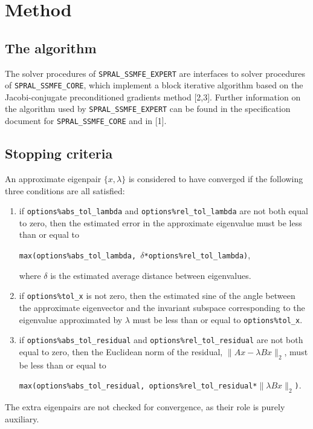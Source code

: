 \section{Method}
\label{ssmfe_expert:method}

\subsection{The algorithm}

The solver procedures of
\texttt{SPRAL\_SSMFE\_EXPERT}
are interfaces to solver procedures of
\texttt{SPRAL\_SSMFE\_CORE}, which 
implement a block iterative algorithm
based on the Jacobi-conjugate preconditioned gradients %
method [2,3].
Further information on the algorithm used by
\texttt{SPRAL\_SSMFE\_EXPERT} can be found in the
specification document for \texttt{SPRAL\_SSMFE\_CORE}
and in [1].

\subsection{Stopping criteria}

An approximate eigenpair 
$\{x,\lambda\}$ is considered to have converged
if %
the following three conditions are all satisfied:
%
\begin{enumerate}
%
\item
if {\tt options\%abs\_tol\_lambda} and 
{\tt options\%rel\_tol\_lambda}
are not both equal to zero, then
the estimated error in the approximate eigenvalue
must be less than or equal to

{\tt max(options\%abs\_tol\_lambda, 
$\delta$*options\%rel\_tol\_lambda)},

where $\delta$ is the estimated average distance
between eigenvalues.
\item
if {\tt options\%tol\_x} is not zero, then
the estimated sine of the angle between
the approximate eigenvector and the invariant subspace
corresponding to the eigenvalue 
approximated by $\lambda$
must be less than or equal to {\tt options\%tol\_x}.
\item
if {\tt options\%abs\_tol\_residual} and 
{\tt options\%rel\_tol\_residual}
are not both equal to zero, then
the Euclidean norm of the residual,
$\|A x - \lambda B x\|_2$,
must be less than or equal to

{\tt max(options\%abs\_tol\_residual, 
options\%rel\_tol\_residual*$\|\lambda B x\|_2$)}.
%
\end{enumerate}
%
The extra eigenpairs are not checked for convergence,
as their role is purely auxiliary.


